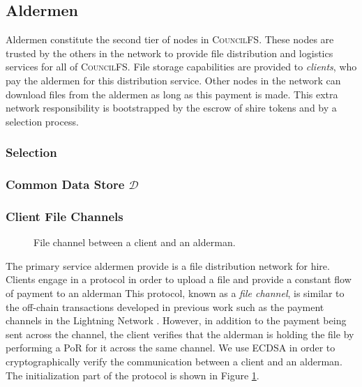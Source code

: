 \documentclass{article}
\begin{document}
\subsection{Aldermen}

Aldermen constitute the second tier of nodes in \textsc{CouncilFS}. These nodes are
trusted by the others in the network to provide file distribution and
logistics services for all of \textsc{CouncilFS}. File storage capabilities are provided
to \emph{clients}, who pay the aldermen for this distribution service. Other
nodes in the network can download files from the aldermen as long as this
payment is made. This extra network responsibility is bootstrapped by the escrow
of shire tokens and by a selection process.

\subsubsection{Selection}

\subsubsection{Common Data Store $\mathcal{D}$}

\subsubsection{Client File Channels}

\begin{figure}[t]
  \centering
  \fbox{\rule[-.5cm]{4cm}{4cm} \rule[-.5cm]{4cm}{0cm}}
  \caption{File channel between a client and an alderman.}
  \label{fig:channel}
\end{figure}

The primary service aldermen provide is a file distribution network for hire.
Clients engage in a protocol in order to upload a file and provide a constant
flow of payment to an alderman This
protocol, known as a \emph{file channel}, is similar to the off-chain
transactions developed in previous work such as the payment channels in the
Lightning Network \cite{lightning}. However, in addition to the payment being
sent across the channel, the client verifies that the alderman is holding the
file by performing a PoR for it across the same channel. We use ECDSA in order
to cryptographically verify the communication between a client and an alderman.
The initialization part of the protocol is shown in Figure \ref{fig:channel}.
\end{document}
